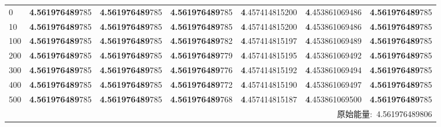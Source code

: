 \begin{table}[H]
\begin{tabular}{lllllll}
	\midrule
	0     &\textbf{4.561976489}785   &\textbf{4.561976489}785   &\textbf{4.561976489}785   &\textbf{4}.457414815200   &\textbf{4}.453861069486   &\textbf{4.561976489}785 \\
	10    &\textbf{4.561976489}785   &\textbf{4.561976489}785   &\textbf{4.561976489}785   &\textbf{4}.457414815200   &\textbf{4}.453861069486   &\textbf{4.561976489}785 \\
	100   &\textbf{4.561976489}785   &\textbf{4.561976489}785   &\textbf{4.561976489}782   &\textbf{4}.457414815197   &\textbf{4}.453861069489   &\textbf{4.561976489}785 \\
	200   &\textbf{4.561976489}785   &\textbf{4.561976489}785   &\textbf{4.561976489}779   &\textbf{4}.457414815195   &\textbf{4}.453861069492   &\textbf{4.561976489}785 \\
	300   &\textbf{4.561976489}785   &\textbf{4.561976489}785   &\textbf{4.561976489}776   &\textbf{4}.457414815192   &\textbf{4}.453861069494   &\textbf{4.561976489}785 \\
	400   &\textbf{4.561976489}785   &\textbf{4.561976489}785   &\textbf{4.561976489}772   &\textbf{4}.457414815190   &\textbf{4}.453861069497   &\textbf{4.561976489}785 \\
	500   &\textbf{4.561976489}785   &\textbf{4.561976489}785   &\textbf{4.561976489}768   &\textbf{4}.457414815187   &\textbf{4}.453861069500   &\textbf{4.561976489}785 \\
	\midrule
	  \multicolumn{7}{r}{原始能量:~4.561976489806} \\
	  \bottomrule
	  \end{tabular}\label{tab_PAVF:1}%
  \end{table}%


